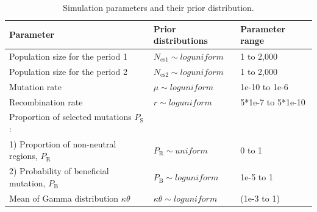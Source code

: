 \documentclass[a4paper, 12pt]{article}
\begin{document}
\begin{table}[ht]
 \caption{Simulation parameters and their prior distribution.}
  \centering
  \label{table:table1}
  \begin{tabular}{lll}
   \cmidrule(r){1-3}
    Parameter                                                    & Prior distributions                  & Parameter range\\
    \midrule
    Population size for the period 1                             & $N_{\mathrm{cs}1} \sim loguniform$   & 1 to 2,000\\
    Population size for the period 2                             & $N_{\mathrm{cs}2}  \sim loguniform$  & 1 to 2,000\\
    Mutation rate                                                & $\mu \sim loguniform$                & 1e-10 to 1e-6\\
    Recombination rate                                           & $r \sim loguniform$                  & 5*1e-7 to 5*1e-10\\
    Proportion of selected mutations $P_{\mathrm{S}}$:           &                                      &                  \\
        1) Proportion of non-neutral regions, $P_{\mathrm{R}}$   & $P_{\mathrm{R}} \sim uniform$        & 0 to 1\\
        2) Probability of beneficial mutation, $P_{\mathrm{B}}$  & $P_{\mathrm{B}} \sim loguniform$     & 1e-5 to 1\\ 
    Mean of Gamma distribution $\kappa\theta$                    & $\kappa\theta \sim loguniform$       & (1e-3 to 1)\\
    \bottomrule
  \end{tabular}
  \label{tab:tab1}
\end{table}
\end{document}
